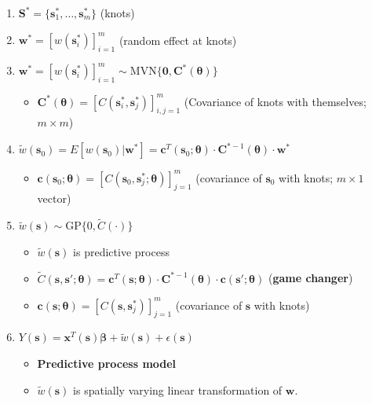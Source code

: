 \documentclass{article}
\begin{document}
\begin{enumerate}
\item $\pmb{S}^{*} = \{\pmb{s}_{1}^{*}, \dots, \pmb{s}_{m}^{*}\}$ (knots)
\item $\pmb{w}^{*} = \left[w(\pmb{s}_{i}^{*})\right]_{i=1}^{m}$ (random effect at knots)
\item $\pmb{w}^{*} = \left[w(\pmb{s}_{i}^{*})\right]_{i=1}^{m} \sim \text{MVN}\{\pmb{0}, \pmb{C}^{*}(\pmb{\theta})\}$
            \begin{itemize}
            \item $\pmb{C}^{*}(\pmb{\theta}) = \left[C(\pmb{s}_{i}^{*}, \pmb{s}_{j}^{*})\right]_{i,j = 1}^{m}$ (Covariance of knots with themselves; $m \times m$)
            \end{itemize}
\item $\tilde{w}(\pmb{s}_{0}) = E[w(\pmb{s}_{0})|\pmb{w}^{*}]= \pmb{c}^{T}(\pmb{s}_{0};\pmb{\theta}) \cdot \pmb{C}^{*-1}(\pmb{\theta}) \cdot \pmb{w}^{*}$
            \begin{itemize}
            \item $\pmb{c}(\pmb{s}_{0};\pmb{\theta}) = \left[C(\pmb{s}_{0}, \pmb{s}_{j}^{*}; \pmb{\theta})\right]_{j = 1}^{m}$ (covariance of $\pmb{s}_{0}$ with knots; $m \times 1$ vector)
            \end{itemize}
\item $\tilde{w}(\pmb{s}) \sim \text{GP}\{0, \tilde{C}(\cdot)\}$
              \begin{itemize}
              \item $\tilde{w}(\pmb{s})$ is predictive process
              \item $\tilde{C}(\pmb{s}, \pmb{s}'; \pmb{\theta}) = \pmb{c}^{T}(\pmb{s};\pmb{\theta}) \cdot \pmb{C}^{*-1}(\pmb{\theta}) \cdot \pmb{c}(\pmb{s}';\pmb{\theta})$ ({\bf game changer})
              \item $\pmb{c}(\pmb{s};\pmb{\theta}) = \left[C(\pmb{s}, \pmb{s}_{j}^{*})\right]_{j = 1}^{m}$ (covariance of $\pmb{s}$ with knots)
              
              \end{itemize}
\item $Y(\pmb{s}) = \pmb{x}^{T}(\pmb{s})\pmb{\beta} + \tilde{w}(\pmb{s}) + \epsilon(\pmb{s})$
              \begin{itemize}
              \item {\bf Predictive process model}
              \item $\tilde{w}(\pmb{s})$ is spatially varying linear transformation of $\pmb{w}$.
              \end{itemize}
\end{enumerate}
\end{document}
